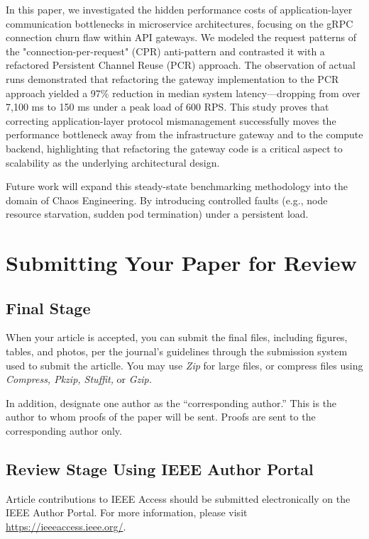 \documentclass{ieeeaccess}
\begin{document}
In this paper, we investigated the hidden performance costs of application-layer communication bottlenecks in microservice architectures, focusing on the gRPC connection churn flaw within API gateways. We modeled the request patterns of the "connection-per-request" (CPR) anti-pattern and contrasted it with a refactored Persistent Channel Reuse (PCR) approach. The observation of actual runs demonstrated that refactoring the gateway implementation to the PCR approach yielded a 97\% reduction in median system latency—dropping from over 7,100 ms to 150 ms under a peak load of 600 RPS. This study proves that correcting application-layer protocol mismanagement successfully moves the performance bottleneck away from the infrastructure gateway and to the compute backend, highlighting that refactoring the gateway code is a critical aspect to scalability as the underlying architectural design.

Future work will expand this steady-state benchmarking methodology into the domain of Chaos Engineering. By introducing controlled faults (e.g., node resource starvation, sudden pod termination) under a persistent load. 

\section{\break Submitting Your Paper for Review}

\subsection{Final Stage}
When your article is accepted, you can submit the final files, including figures, tables, and photos, per the journal's guidelines through the submission system used to submit the articlle.
 You may use \emph{Zip} for large files, or compress files using \emph{Compress, Pkzip, Stuffit,} or \emph{Gzip.}

In addition, designate one author as the ``corresponding author.'' This is the author to
whom proofs of the paper will be sent. Proofs are sent to the corresponding
author only.

\subsection{Review Stage Using IEEE Author Portal}
Article contributions to IEEE Access should be submitted electronically on the IEEE Author Portal. For more information, please visit
\underline{https://ieeeaccess.ieee.org/}.
\end{document}
